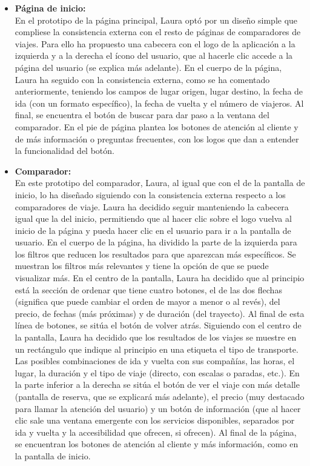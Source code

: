 \begin{itemize}
    \item\textbf{Página de inicio:} \\ En el prototipo de la página principal, Laura optó por un diseño simple que compliese la consistencia externa con el resto de páginas de comparadores de viajes. Para ello ha propuesto una cabecera con el logo de la aplicación a la izquierda y a la derecha el ícono del usuario, que al hacerle clic accede a la página del usuario (se explica más adelante). 
    En el cuerpo de la página, Laura ha seguido con la consistencia externa, como se ha comentado anteriormente, teniendo los campos de lugar origen, lugar destino, la fecha de ida (con un formato específico), la fecha de vuelta y el número de viajeros. Al final, se encuentra el botón de buscar para dar paso a la ventana del comparador.
    En el pie de página plantea los botones de atención al cliente y de más información o preguntas frecuentes, con los logos que dan a entender la funcionalidad del botón.
    
    \item\textbf{Comparador:} \\ 

    En este prototipo del comparador, Laura, al igual que con el de la pantalla de inicio, lo ha diseñado siguiendo con la consistencia externa respecto a los comparadores de viaje.
    Laura ha decidido seguir manteniendo la cabecera igual que la del inicio, permitiendo que al hacer clic sobre el logo vuelva al inicio de la página y pueda hacer clic en el usuario para ir a la pantalla de usuario.
    En el cuerpo de la página, ha dividido la parte de la izquierda para los filtros que reducen los resultados para que aparezcan más específicos. Se muestran los filtros más relevantes y tiene la opción de que se puede visualizar más.
    En el centro de la pantalla, Laura ha decidido que al principio está la sección de ordenar que tiene cuatro botones, el de las dos flechas (significa que puede cambiar el orden de mayor a menor o al revés), del precio, de fechas (más próximas) y de duración (del trayecto). Al final de esta línea de botones, se sitúa el botón de volver atrás.
    Siguiendo con el centro de la pantalla, Laura ha decidido que los resultados de los viajes se muestre en un rectángulo que indique al principio en una etiqueta el tipo de transporte. Las posibles combinaciones de ida y vuelta con sus compañías, las horas, el lugar, la duración y el tipo de viaje (directo, con escalas o paradas, etc.). En la parte inferior a la derecha se sitúa el botón de ver el viaje con más detalle (pantalla de reserva, que se explicará más adelante), el precio (muy destacado para llamar la atención del usuario) y un botón de información (que al hacer clic sale una ventana emergente con los servicios disponibles, separados por ida y vuelta y la accesibilidad que ofrecen, si ofrecen).
    Al final de la página, se encuentran los botones de atención al cliente y más información, como en la pantalla de inicio.
    

\end{itemize}
